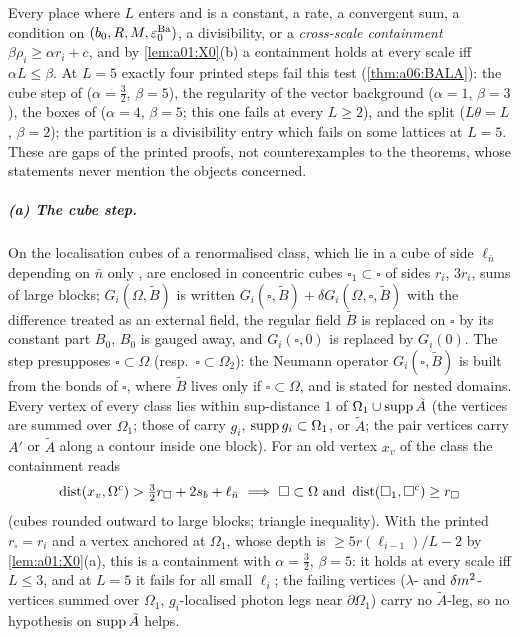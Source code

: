 Every place where $L$ enters \cite{Ba1,Ba2,Ba3} and \cite[Thm.~3.1]{K1} is a constant, a rate, a convergent sum, a condition on $(b_0,R,M,\varepsilon_0^{\mathrm{Ba}})$, a divisibility, or a \emph{cross-scale containment} $\beta\rho_i\ge\alpha r_i+c$, and by \cref{lem:a01:X0}(b) a containment holds at every scale iff $\alpha L\le\beta$. At $L=5$ exactly four printed steps fail this test (\cref{thm:a06:BALA}): the cube step of \cite[p.~433]{Ba3} ($\alpha=\frac32$, $\beta=5$), the regularity of the vector background \cite[Lemma~2.3]{Ba2} ($\alpha=1$, $\beta=3$), the boxes of \cite[Lemma~2.4]{Ba2} ($\alpha=4$, $\beta=5$; this one fails at every $L\ge2$), and the split \cite[(2.89)]{Ba2} ($L\theta=L$, $\beta=2$); the partition \cite[(3.43)--(3.45)]{Ba2} is a divisibility entry which fails on some lattices at $L=5$. These are gaps of the printed proofs, not counterexamples to the theorems, whose statements never mention the objects concerned.

\subparagraph{(a) The cube step.} On \cite[p.~433]{Ba3} the localisation cubes of a renormalised class, which lie in a cube of side $\ell_{\bar n}$ depending on $\bar n$ only \cite[p.~432]{Ba3}, are enclosed in concentric cubes $\square_1\subset\square$ of sides $r_i$, $3r_i$, sums of large blocks; $G_i(\Omega,\tilde B)$ is written $G_i(\square,\tilde B)+\delta G_i(\Omega,\square,\tilde B)$ with the difference treated as an external field, the regular field $\tilde B$ is replaced on $\square$ by its constant part $B_0$, $B_0$ is gauged away, and $G_i(\square,0)$ is replaced by $G_i(0)$. The step presupposes $\square\subset\Omega$ (resp.\ $\square\subset\Omega_2$): the Neumann operator $G_i(\square,\tilde B)$ is built from the bonds of $\square$, where $\tilde B$ lives only if $\square\subset\Omega$, and \cite[(2.26)]{Ba1} is stated for nested domains. Every vertex of every class lies within sup-distance $1$ of $\Omega_1\cup\operatorname{supp}\tilde A$ (the vertices \cite[(1.6)--(1.7)]{Ba3} are summed over $\Omega_1$; those of \cite[(1.8)--(1.11)]{Ba3} carry $g_i$, $\operatorname{supp} g_i\subset\Omega_1$, or $\tilde A$; the pair vertices \cite[(1.12)--(1.15)]{Ba3} carry $A'$ or $\tilde A$ along a contour inside one block). For an old vertex $x_v$ of the class the containment reads
\begin{equation}\label{eq:a01:N}
\dist(x_v,\Omega^c)>\tfrac32r_\square+2s_b+\ell_{\bar n}\ \Longrightarrow\ \square\subset\Omega\ \text{and}\ \dist(\square_1,\square^c)\ge r_\square
\end{equation}
(cubes rounded outward to large blocks; triangle inequality). With the printed $r_\square=r_i$ and a vertex anchored at $\Omega_1$, whose depth is $\ge5r(\ell_{i-1})/L-2$ by \cref{lem:a01:X0}(a), this is a containment with $\alpha=\frac32$, $\beta=5$: it holds at every scale iff $L\le3$, and at $L=5$ it fails for all small $\ell_i$; the failing vertices ($\lambda$- and $\delta m^2$-vertices summed over $\Omega_1$, $g_i$-localised photon legs near $\partial\Omega_1$) carry no $\tilde A$-leg, so no hypothesis on $\operatorname{supp}\tilde A$ helps.

